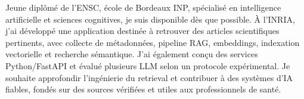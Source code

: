 
\begin{cvparagraph}
Jeune diplômé de l’ENSC, école de Bordeaux INP, spécialisé en intelligence artificielle et sciences cognitives, je suis disponible dès que possible. À l’INRIA, j’ai développé une application destinée à retrouver des articles scientifiques pertinents, avec collecte de métadonnées, pipeline RAG, embeddings, indexation vectorielle et recherche sémantique. J’ai également conçu des services Python/FastAPI et évalué plusieurs LLM selon un protocole expérimental. Je souhaite approfondir l’ingénierie du retrieval et contribuer à des systèmes d’IA fiables, fondés sur des sources vérifiées et utiles aux professionnels de santé.
\end{cvparagraph}
